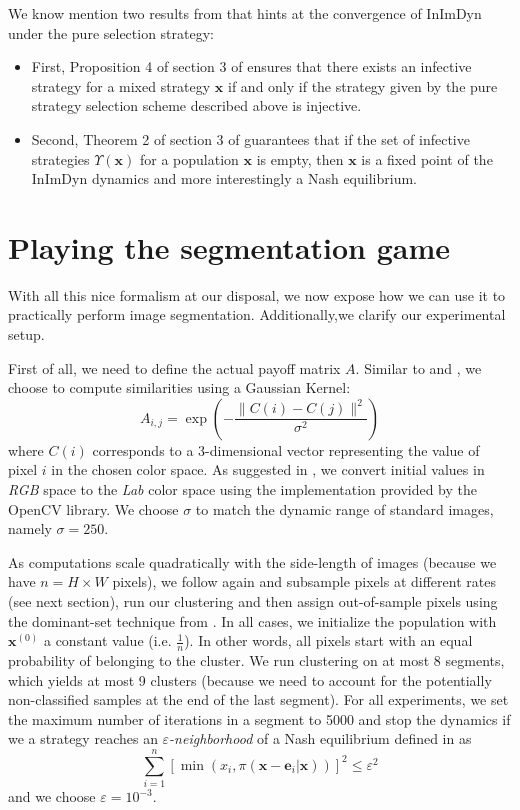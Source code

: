 \documentclass[11pt,a4paper]{article}
\begin{document}
We know mention two results from \cite{bulo-thesis} that hints at the convergence of InImDyn under the pure selection strategy: 
\begin{itemize}
    \item First, Proposition 4 of section 3 of \cite{bulo-thesis} ensures that there exists an infective strategy for a mixed strategy $\textbf{x}$ if and only if the strategy given by the pure strategy selection scheme described above is injective. 
    \item Second, Theorem 2 of section 3 of \cite{bulo-thesis} guarantees that if the set of infective strategies $\Upsilon(\mathbf{x})$ for a population $\mathbf{x}$ is empty, then $\mathbf{x}$ is a fixed point of the InImDyn dynamics and more interestingly a Nash equilibrium.
\end{itemize}

\section{Playing the segmentation game}
\label{sec:seg-game}

With all this nice formalism at our disposal, we now expose how we can use it to practically perform image segmentation. Additionally,we clarify our experimental setup. 

First of all, we need to define the actual payoff matrix $A$. Similar to \cite{bulo-thesis} and \cite{game-clustering}, we choose to compute similarities using a Gaussian Kernel:
\begin{equation}
    A_{i, j}=\exp\left(-\frac{\lVert C(i) - C(j)\rVert^2}{\sigma^2}\right)
\end{equation}
where $C(i)$ corresponds to a 3-dimensional vector representing the value of pixel $i$ in the chosen color space. As suggested in \cite{bulo-thesis}, we convert initial values in \textit{RGB} space to the \textit{Lab} color space using the implementation provided by the OpenCV library\cite{opencv_library}. We choose $\sigma$ to match the dynamic range of standard images, namely $\sigma=250$.

As computations scale quadratically with the side-length of images (because we have $n=H\times W$ pixels), we follow again \cite{bulo-thesis} and subsample pixels at different rates (see next section), run our clustering and then assign out-of-sample pixels using the dominant-set technique from \cite{dominant-set}. In all cases, we initialize the population with $\mathbf{x}^{(0)}$ a constant value (i.e. $\frac{1}{n}$). In other words, all pixels start with an equal probability of belonging to the cluster. We run clustering on at most 8 segments, which yields at most 9 clusters (because we need to account for the potentially non-classified samples at the end of the last segment). For all experiments, we set the maximum number of iterations in a segment to 5000 and stop the dynamics if we a strategy reaches an \textit{$\varepsilon$-neighborhood} of a Nash equilibrium defined in \cite{bulo-thesis} as
\begin{equation}
    \sum_{i=1}^n\left[\min(x_i, \pi(\mathbf{x}-\mathbf{e}_i|\mathbf{x}))\right]^2\leq \varepsilon^2
\end{equation}
and we choose $\varepsilon=10^{-3}$.
\end{document}
